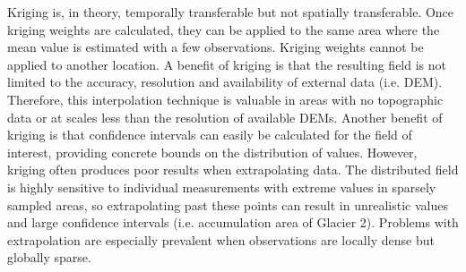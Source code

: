 \documentclass[12pt]{article}
\begin{document}
Kriging is, in theory, temporally transferable but not spatially transferable. Once kriging weights are calculated, they can be applied to the same area where the mean value is estimated with a few observations. Kriging weights cannot be applied to another location. A benefit of kriging is that the resulting field is not limited to the accuracy, resolution and availability of external data (i.e. DEM). Therefore, this interpolation technique is valuable in areas with no topographic data or at scales less than the resolution of available DEMs. Another benefit of kriging is that confidence intervals can easily be calculated for the field of interest, providing concrete bounds on the distribution of values. However, kriging often produces poor results when extrapolating data. The distributed field is highly sensitive to individual measurements with extreme values in sparsely sampled areas, so extrapolating past these points can result in unrealistic values and large confidence intervals (i.e. accumulation area of Glacier 2). Problems with extrapolation are especially prevalent when observations are locally dense but globally sparse.




\end{document}
